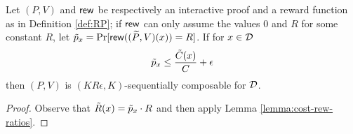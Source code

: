 \begin{lemma}
	\label{cor:prob}
	Let $(P,V)$ and $\mathsf{rew}$ be respectively an interactive proof and a reward 
	function as in 
	Definition \ref{def:RP}; if $\mathsf{rew}$ can only assume the values $0$ and $R$ for 
	some constant $R$, let $\tilde{p}_x = \Pr[\mathsf{rew}((\widetilde{P},V)(x)) = R]$. If for $x \in {\cal D}$
	$$  \tilde{p}_x \leq \frac{\tilde{C}(x)}{C} + \epsilon $$
	then $(P,V)$ is $(KR\epsilon, K)$-sequentially composable for $\cal D$. 
\end{lemma}
\begin{proof}
Observe that $\tilde{R}(x) = \tilde{p}_x\cdot R$ and then apply Lemma 
\ref{lemma:cost-rew-ratios}.
\end{proof}


